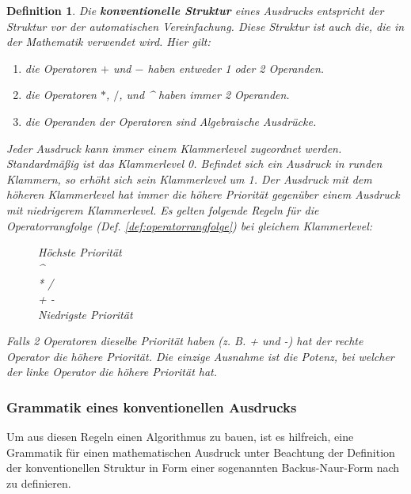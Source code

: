 \documentclass[11pt]{article}
\newtheorem{defin}{Definition}
\newcommand{\lab}[1]{(Def. \ref{#1})}
\begin{document}
\begin{defin}
  \label{def:konventionelle_struktur}
  Die \textbf{konventionelle Struktur} eines Ausdrucks entspricht der Struktur vor der automatischen Vereinfachung. 
  Diese Struktur ist auch die, die in der Mathematik verwendet wird. Hier gilt:

  \begin{enumerate}
    \item die Operatoren $+$ und $-$ haben entweder 1 oder 2 Operanden.
    \item die Operatoren $*$, $/$, und \textrm{\textasciicircum} haben immer 2 Operanden.
    \item die Operanden der Operatoren  sind Algebraische Ausdrücke.
  \end{enumerate}

  Jeder Ausdruck kann immer einem Klammerlevel zugeordnet werden. 
  Standardmäßig ist das Klammerlevel 0. Befindet sich ein Ausdruck in runden Klammern, 
  so erhöht sich sein Klammerlevel um 1. Der Ausdruck mit dem höheren Klammerlevel hat immer die höhere Priorität 
  gegenüber einem Ausdruck mit niedrigerem Klammerlevel.
  Es gelten folgende Regeln für die Operatorrangfolge \lab{def:operatorrangfolge} bei gleichem Klammerlevel:

  \begin{figure}[h]
  \begin{center}
    Höchste Priorität \\
    \textrm{\textasciicircum} \\
    \textrm{* /} \\
    \textrm{+ -} \\
    Niedrigste Priorität
  \end{center}
  \end{figure}

  Falls 2 Operatoren dieselbe Priorität haben (z. B. + und -) hat 
  der rechte Operator die höhere Priorität.
  Die einzige Ausnahme ist die Potenz, bei welcher der linke Operator
  die höhere Priorität hat.
\end{defin}

\subsubsection{Grammatik eines konventionellen Ausdrucks}

Um aus diesen Regeln einen Algorithmus zu bauen, ist es hilfreich, 
eine Grammatik für einen mathematischen Ausdruck unter Beachtung der Definition der konventionellen Struktur 
in Form einer sogenannten Backus-Naur-Form nach \citeauthor{A_COMP} \cite{A_COMP} zu definieren. 
\end{document}

